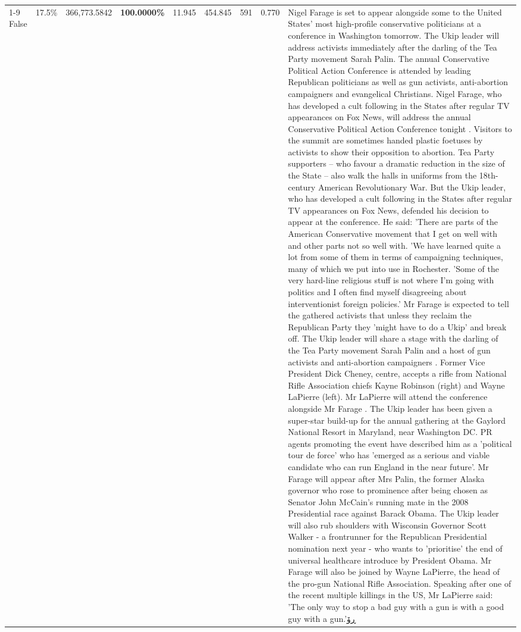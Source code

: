 \begin{table}[H]
\begin{tabular}{lllrlllll}
\cline{1-9}
False & 17.5\% & 366,773.5842 & \bfseries \color{red} 100.0000\% & 11.945 & 454.845 & 591 & 0.770 & Nigel Farage is set to appear alongside some to the United States' most high-profile conservative politicians at a conference in Washington tomorrow. The Ukip leader will address activists immediately after the darling of the Tea Party movement Sarah Palin. The annual Conservative Political Action Conference is attended by leading Republican politicians as well as gun activists, anti-abortion campaigners and evangelical Christians. Nigel Farage, who has developed a cult following in the States after regular TV appearances on Fox News, will address the annual Conservative Political Action Conference tonight . Visitors to the summit are sometimes handed plastic foetuses by activists to show their opposition to abortion. Tea Party supporters – who favour a dramatic reduction in the size of the State – also walk the halls in uniforms from the 18th-century American Revolutionary War. But the Ukip leader, who has developed a cult following in the States after regular TV appearances on Fox News, defended his decision to appear at the conference. He said: 'There are parts of the American Conservative movement that I get on well with and other parts not so well with. 'We have learned quite a lot from some of them in terms of campaigning techniques, many of which we put into use in Rochester. 'Some of the very hard-line religious stuff is not where I'm going with politics and I often find myself disagreeing about interventionist foreign policies.' Mr Farage is expected to tell the gathered activists that unless they reclaim the Republican Party they 'might have to do a Ukip' and break off. The Ukip leader will share a stage with the darling of the Tea Party movement Sarah Palin and a host of gun activists and anti-abortion campaigners . Former Vice President Dick Cheney, centre, accepts a rifle from National Rifle Association chiefs Kayne Robinson (right) and Wayne LaPierre (left). Mr LaPierre will attend the conference alongside Mr Farage . The Ukip leader has been given a super-star build-up for the annual gathering at the Gaylord National Resort in Maryland, near Washington DC. PR agents promoting the event have described him as a 'political tour de force' who has 'emerged as a serious and viable candidate who can run England in the near future'. Mr Farage will appear after Mrs Palin, the former Alaska governor who rose to prominence after being chosen as Senator John McCain's running mate in the 2008 Presidential race against Barack Obama. The Ukip leader will also rub shoulders with Wisconsin Governor Scott Walker - a frontrunner for the Republican Presidential nomination next year - who wants to 'prioritise' the end of universal healthcare introduce by President Obama. Mr Farage will also be joined by Wayne LaPierre, the head of the pro-gun National Rifle Association. Speaking after one of the recent multiple killings in the US, Mr LaPierre said: 'The only way to stop a bad guy with a gun is with a good guy with a gun.'ڕۆ \\

\end{tabular}
\end{table}
